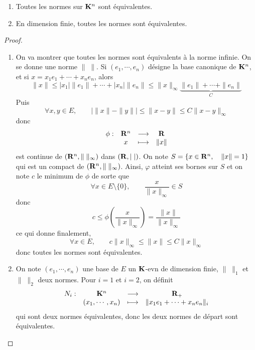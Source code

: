 \begin{thm}
\begin{enumerate}
    \item Toutes les normes sur $\mathbf K^n$ sont équivalentes. 
    \item En dimension finie, toutes les normes sont équivalentes.
\end{enumerate}
\end{thm}

\begin{proof}~
    \begin{enumerate}
        \item On va montrer que toutes les normes sont équivalents à la norme infinie. On se donne une norme $\|\;\|$. Si $(e_1,\cdots ,e_n)$ désigne la base canonique de $\mathbf K^n$, et si $x=x_1e_1+\cdots +x_ne_n$, alors \[
                \|x\|\leq |x_1|\|e_1\|+\cdots +|x_n|\|e_n\|\leq \|x\|_\infty \underbrace{\|e_1\|+\cdots +\|e_n\|}_{C}
        \] 
        Puis \[
        \forall  x, y \in  E, \qquad |\|x\|-\|y\||\leq \|x-y\|\leq C \|x-y\|_\infty
        \] 
        donc  \[
        \begin{matrix}
            \phi:& \mathbf R^n & \longrightarrow & \mathbf R \\
            & x & \longmapsto & \|x\|
        \end{matrix}
        \] 
        est continue de $(\mathbf R^n, \|\;\|_\infty)$ dans $(\mathbf R,|\;|)$. On note $S= \{x \in  \mathbf R^n, \quad \|x\|=1\} $ qui est un compact de $(\mathbf R^n,\|\;\|_\infty)$. Ainsi, $\varphi$ atteint ses bornes sur  $S$ et on note  $c$ le minimum de  $\phi$ de sorte que  \[
        \forall  x \in  E\setminus \{ 0\} , \qquad \frac{x}{\|x\|_\infty} \in  S
        \] 
        donc \[
            c \leq  \phi \left( \frac{x}{\|x\|_\infty} \right) = \frac{\|x\|}{\|x\|_\infty}
        \] 
        ce qui donne finalement, \[
        \forall  x \in  E, \qquad  c\|x\|_\infty \leq  \|x\|\leq C \|x\|_\infty
        \]
        donc toutes les normes sont équivalentes.
    \item On note $(e_1,\cdots ,e_n)$ une base de $E$ un  $\mathbf K$-evn de dimension finie, $\|\;\|_1$ et $\|\;\|_2$ deux normes. Pour $i=1$ et  $i=2$, on définit  \[
    \begin{matrix}
        N_i:& \mathbf K^n & \longrightarrow & \mathbf R_+ \\
            & (x_1,\cdots ,x_n) & \longmapsto & \|x_1e_1+\cdots +x_ne_n\|_i
    \end{matrix}
    \] 
    qui sont  deux normes équivalentes, donc les deux normes de départ sont équivalentes.
    \end{enumerate}
\end{proof}

